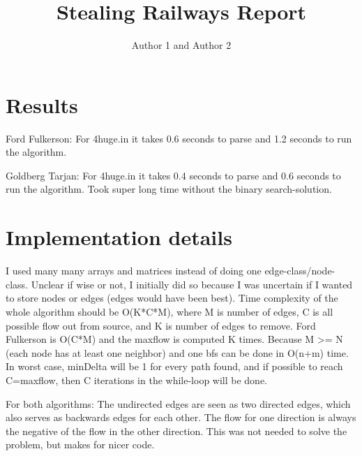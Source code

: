 \documentclass{article}
\title{Stealing Railways Report}
\author{Author 1 and Author 2}
\begin{document}
  \maketitle

  \section{Results}

  
  Ford Fulkerson:
  For 4huge.in it takes 0.6 seconds to parse and 1.2 seconds to run the algorithm.
  
  Goldberg Tarjan:
  For 4huge.in it takes 0.4 seconds to parse and 0.6 seconds to run the algorithm.
  Took super long time without the binary search-solution.



  \section{Implementation details}

	
	I used many many arrays and matrices instead of doing one edge-class/node-class. Unclear if wise or not, I initially did so because I was uncertain if I wanted to store nodes or edges (edges would have been best).
    Time complexity of the whole algorithm should be O(K*C*M), where M is number of edges, C is all possible flow out from source, and K is number of edges to remove.
    Ford Fulkerson is O(C*M) and the maxflow is computed K times.
    Because M >= N (each node has at least one neighbor) and one bfs can be done in O(n+m) time.
    In worst case, minDelta will be 1 for every path found, and if possible to reach C=maxflow, then C iterations in the while-loop will be done.
    
    For both algorithms:
    The undirected edges are seen as two directed edges, which also serves as backwards edges for each other.
    The flow for one direction is always the negative of the flow in the other direction.
    This was not needed to solve the problem, but makes for nicer code.
\end{document}
